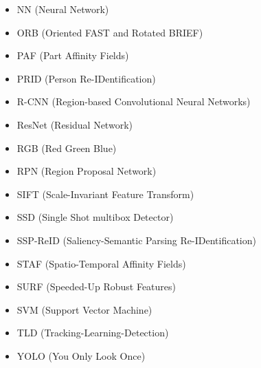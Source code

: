 \begin{itemize}
	\item NN (Neural Network)
	\item ORB (Oriented FAST and Rotated BRIEF)
	\item PAF (Part Affinity Fields)
	\item PRID (Person Re-IDentification)
	\item R-CNN (Region-based Convolutional Neural Networks)
	\item ResNet (Residual Network)
	\item RGB (Red Green Blue)
	\item RPN (Region Proposal Network)
	\item SIFT (Scale-Invariant Feature Transform)
	\item SSD (Single Shot multibox Detector)
	\item SSP-ReID (Saliency-Semantic Parsing Re-IDentification)
	\item STAF (Spatio-Temporal Affinity Fields)
	\item SURF (Speeded-Up Robust Features)
	\item SVM (Support Vector Machine)
	\item TLD (Tracking-Learning-Detection)
	\item YOLO (You Only Look Once)
\end{itemize}




